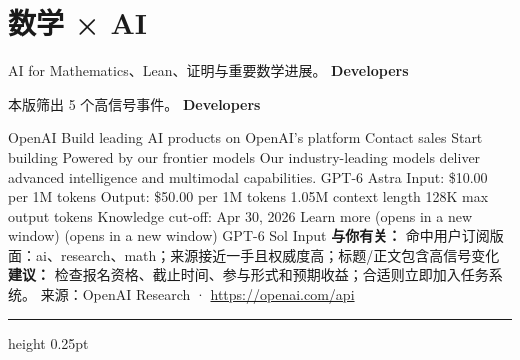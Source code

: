 \documentclass[10.5pt]{ctexart}
\begin{document}
\section*{数学 × AI}
{\color{ormuted} AI for Mathematics、Lean、证明与重要数学进展。}
\vspace{2mm}
{\LARGE\bfseries Developers}\par
\vspace{1mm}
{\color{ormuted} 本版筛出 5 个高信号事件。}
\vspace{3mm}
{\Large\bfseries Developers}\par
OpenAI Build leading AI products on OpenAI’s platform Contact sales Start building Powered by our frontier models Our industry-leading models deliver advanced intelligence and multimodal capabilities. GPT-6 Astra Input: \$10.00 per 1M tokens Output: \$50.00 per 1M tokens 1.05M context length 128K max output tokens Knowledge cut-off: Apr 30, 2026 Learn more (opens in a new window) (opens in a new window) GPT-6 Sol Input
\textbf{与你有关：} 命中用户订阅版面：ai、research、math；来源接近一手且权威度高；标题/正文包含高信号变化
\textbf{建议：} 检查报名资格、截止时间、参与形式和预期收益；合适则立即加入任务系统。
{\footnotesize\color{ormuted} 来源：OpenAI Research · \url{https://openai.com/api}}
\vspace{4mm}
\hrule height 0.25pt
\vspace{3mm}
\end{document}
